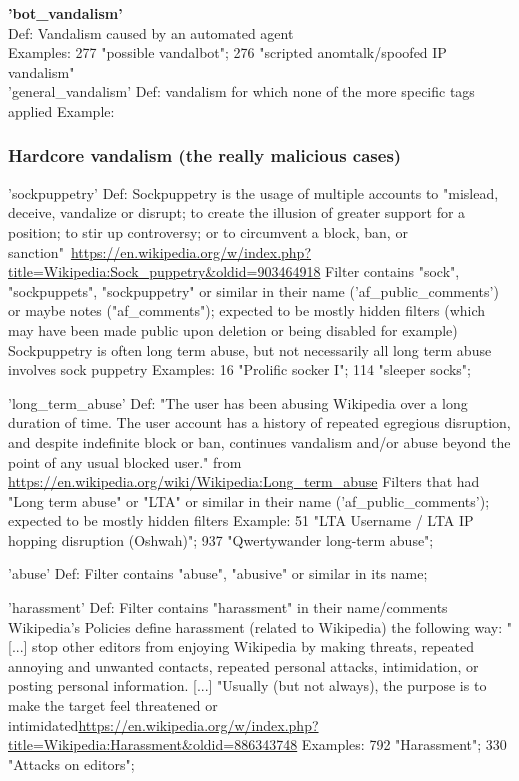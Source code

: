 \textbf{'bot\_vandalism'}\\
 Def: Vandalism caused by an automated agent\\
 Examples: 277 "possible vandalbot"; 276 "scripted anomtalk/spoofed IP vandalism"\\

'general\_vandalism'
 Def: vandalism for which none of the more specific tags applied
 Example:

\subsubsection{Hardcore vandalism (the really malicious cases)}
'sockpuppetry'
  Def: Sockpuppetry is the usage of multiple accounts to "mislead, deceive, vandalize or disrupt; to create the illusion of greater support for a position; to stir up controversy; or to circumvent a block, ban, or sanction"~\url{https://en.wikipedia.org/w/index.php?title=Wikipedia:Sock_puppetry&oldid=903464918}
  Filter contains "sock", "sockpuppets", "sockpuppetry" or similar in their name ('af\_public\_comments') or maybe notes ("af\_comments"); expected to be mostly hidden filters (which may have been made public upon deletion or being disabled for example)
  Sockpuppetry is often long term abuse, but not necessarily all long term abuse involves sock puppetry
  Examples: 16 "Prolific socker I"; 114 "sleeper socks";

'long\_term\_abuse'
  Def:
  "The user has been abusing Wikipedia over a long duration of time. The user account has a history of repeated egregious disruption, and despite indefinite block or ban, continues vandalism and/or abuse beyond the point of any usual blocked user." from \url{https://en.wikipedia.org/wiki/Wikipedia:Long_term_abuse}
  Filters that had "Long term abuse" or "LTA" or similar in their name ('af\_public\_comments'); expected to be mostly hidden filters
  Example: 51 "LTA Username / LTA IP hopping disruption (Oshwah)"; 937 "Qwertywander long-term abuse";

'abuse'
  Def: Filter contains "abuse", "abusive" or similar in its name; %

'harassment'
  Def: Filter contains "harassment" in their name/comments
  Wikipedia's Policies define harassment (related to Wikipedia) the following way: "[...] stop other editors from enjoying Wikipedia by making threats, repeated annoying and unwanted contacts, repeated personal attacks, intimidation, or posting personal information. [...] "Usually (but not always), the purpose is to make the target feel threatened or intimidated\url{https://en.wikipedia.org/w/index.php?title=Wikipedia:Harassment&oldid=886343748}
  Examples: 792 "Harassment"; 330 "Attacks on editors";

